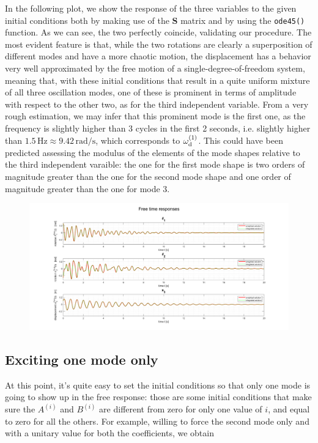 \documentclass[a4paper,12pt,oneside]{article}
\begin{document}
In the following plot, we show the response of the three variables to the given initial conditions both by making use of the $ \mathbf{S} $ matrix and by using the  \lstinline!ode45()! function. As we can see, the two perfectly coincide, validating our procedure. The most evident feature is that, while the two rotations are clearly a superposition of different modes and have a more chaotic motion, the displacement has a behavior very well approximated by the free motion of a single-degree-of-freedom system, meaning that, with these initial conditions that result in a quite uniform mixture of all three oscillation modes, one of these is prominent in terms of amplitude with respect to the other two, as for the third independent variable. From a very rough estimation, we may infer that this prominent mode is the first one, as the frequency is slightly higher than 3 cycles in the first 2 seconds, i.e. slightly higher than $ 1.5 \, \text{Hz} \approx 9.42 \, \text{rad/s} $, which corresponds to $ \omega_\textup{d}^{(1)} $. This could have been predicted assessing the modulus of the elements of the mode shapes relative to the third independent varaible: the one for the first mode shape is two orders of magnitude greater than the one for the second mode shape and one order of magnitude greater than the one for mode 3.

\begin{figure}[h]
	\hspace{-70pt}
	\includegraphics[scale=0.4]{free_time_responses}
\end{figure}


\subsection{Exciting one mode only}
\label{subs:mode_2_excitation}

At this point, it's quite easy to set the initial conditions so that only one mode is going to show up in the free response: those are some initial conditions that make sure the $ A^{(i)} $ and $ B^{(i)} $ are different from zero for only one value of $ i $, and equal to zero for all the others. For example, willing to force the second mode only and with a unitary value for both the coefficients, we obtain
\end{document}
